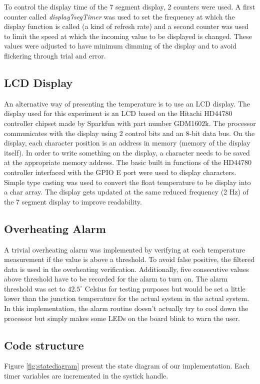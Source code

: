 \documentclass[12pt]{article}
\begin{document}
To control the display time of the 7 segment display, 2 counters were used. A first counter called \textit{display7segTimer} was used to set the frequency at which the display function is called (a kind of refresh rate) and a second counter was used to limit the speed at which the incoming value to be displayed is changed. These values were adjusted to have minimum dimming of the display and to avoid flickering through trial and error.

\subsection{LCD Display}
\label{LCD_dis}
An alternative way of presenting the temperature is to use an LCD display. The display used for this experiment is an LCD based on  the  Hitachi  HD44780  controller  chipset made by Sparkfun with part number GDM1602k. The processor communicates with the display using 2 control bits and an 8-bit data bus. On the display, each character position is an address in memory (memory of the display itself). In order to write something on the display, a character needs to be saved at the appropriate memory address. The basic built in functions of the HD44780 controller interfaced with the GPIO E port were used to display characters. Simple type casting was used to convert the float temperature to be display into a char array. The display gets updated at the same reduced frequency (2 Hz) of the 7 segment display to improve readability. 

\subsection{Overheating Alarm}
A trivial overheating alarm was implemented by verifying at each temperature measurement if the value is above a threshold. To avoid false positive, the filtered data is used in the overheating verification. Additionally, five consecutive values above threshold have to be recorded for the alarm to turn on. The alarm threshold was set to $42.5^\circ$ Celsius for testing purposes but would be set a little lower than the junction temperature for the actual system in the actual system. In this implementation, the alarm routine doesn't actually try to cool down the processor but simply makes some LEDs on the board blink to warn the user.

\subsection{Code structure}
 Figure \ref{fig:statediagram} present the state diagram of our implementation. Each timer variables are incremented in the systick handle.
\end{document}
